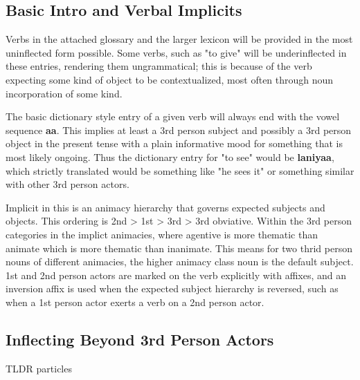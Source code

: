 \subsection{Basic Intro and Verbal Implicits}
Verbs in the attached glossary and the larger lexicon will be provided in the most uninflected form possible. Some verbs, such as "to give" will be underinflected in these entries, rendering them ungrammatical; this is because of the verb expecting some kind of object to be contextualized, most often through noun incorporation of some kind.
\par
The basic dictionary style entry of a given verb will always end with the vowel sequence \textbf{aa}. This implies at least a 3rd person subject and possibly a 3rd person object in the present tense with a plain informative mood for something that is most likely ongoing. Thus the dictionary entry for "to see" would be \textbf{laniyaa}, which strictly translated would be something like "he sees it" or something similar with other 3rd person actors.
\par
Implicit in this is an animacy hierarchy that governs expected subjects and objects. This ordering is 2nd > 1st > 3rd > 3rd obviative. Within the 3rd person categories in the implict animacies, where agentive is more thematic than animate which is more thematic than inanimate. This means for two thrid person nouns of different animacies, the higher animacy class noun is the default subject. 1st and 2nd person actors are marked on the verb explicitly with affixes, and an inversion affix is used when the expected subject hierarchy is reversed, such as when a 1st person actor exerts a verb on a 2nd person actor.

\subsection{Inflecting Beyond 3rd Person Actors}
TLDR particles
